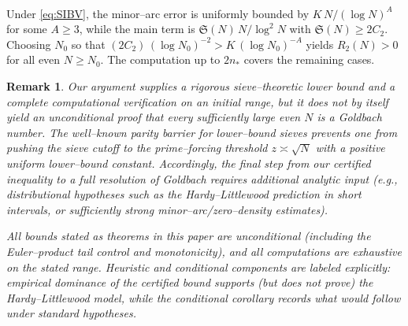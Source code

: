 \documentclass[11pt]{article}
\makeatletter
\theoremstyle{inline}
\newtheorem*{remark}{Remark}
\theoremstyle{break}
\renewenvironment{proof}[1][\proofname]{%
  \par\pushQED{\qed}%
  \normalfont \topsep6\p@\@plus6\p@\relax
  \trivlist
  \item[\hskip\labelsep
        \itshape
    #1\@addpunct{.}]\mbox{}\\  %
}{%
  \popQED\endtrivlist\@endpefalse
}
\theoremstyle{break}
\theoremstyle{break}
\theoremstyle{break}
\theoremstyle{break}
\theoremstyle{break}
\theoremstyle{break}
\theoremstyle{inline}
\makeatother
\begin{document}
\begin{proof}[Proof sketch]
Under \eqref{eq:SIBV}, the minor–arc error is uniformly bounded by \(K\,N/(\log N)^A\) for some \(A\ge 3\), while the main term is \(\mathfrak S(N)\,N/\log^2 N\) with \(\mathfrak S(N)\ge 2C_2\). Choosing \(N_0\) so that \((2C_2)\,(\log N_0)^{-2} > K\,(\log N_0)^{-A}\) yields \(R_2(N)>0\) for all even \(N\ge N_0\). The computation up to \(2n_\ast\) covers the remaining cases.
\end{proof}

\begin{remark}
Our argument supplies a rigorous sieve–theoretic lower bound and a complete computational verification on an initial range, but it does not by itself yield an unconditional proof that every sufficiently large even \(N\) is a Goldbach number. The well–known parity barrier for lower–bound sieves prevents one from pushing the sieve cutoff to the prime–forcing threshold \(z\asymp \sqrt{N}\) with a positive uniform lower–bound constant. Accordingly, the final step from our certified inequality to a full resolution of Goldbach requires additional analytic input (e.g., distributional hypotheses such as the Hardy–Littlewood prediction in short intervals, or sufficiently strong minor–arc/zero–density estimates). 

All bounds stated as theorems in this paper are unconditional (including the Euler–product tail control and monotonicity), and all computations are exhaustive on the stated range. Heuristic and conditional components are labeled explicitly: empirical dominance of the certified bound supports (but does not prove) the Hardy–Littlewood model, while the conditional corollary records what would follow under standard hypotheses.
\end{remark}
\end{document}
